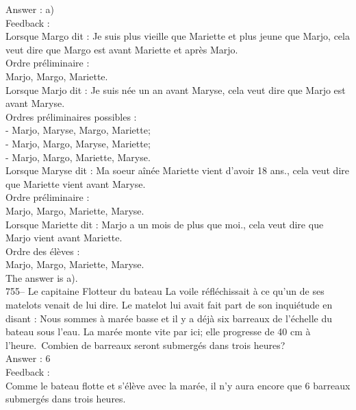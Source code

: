 \documentclass[letterpaper, 12pt]{article}
\begin{document}
Answer : a)\\

Feedback : \\
Lorsque Margo dit : \og Je suis plus vieille que Mariette et plus
jeune que Marjo\fg , cela veut dire que Margo est avant Mariette et
apr\`es Marjo.\\

Ordre pr\'eliminaire :\\
Marjo, Margo, Mariette.\\

Lorsque Marjo dit : \og Je suis n\'ee un an avant Maryse\fg , cela
veut dire que Marjo est avant Maryse.\\

Ordres pr\'eliminaires possibles :\\
- Marjo, Maryse, Margo, Mariette;\\
- Marjo, Margo, Maryse, Mariette;\\
- Marjo, Margo, Mariette, Maryse.\\

Lorsque Maryse dit : \og Ma soeur a\^in\'ee Mariette vient d'avoir
18 ans.\fg , cela veut dire  que Mariette vient avant Maryse.\\

Ordre pr\'eliminaire :\\
Marjo, Margo, Mariette, Maryse.\\

Lorsque Mariette dit : \og Marjo a un mois de plus que moi.\fg ,
cela veut dire que Marjo vient avant Mariette.\\

Ordre des \'el\`eves :\\
Marjo, Margo, Mariette, Maryse.\\

The answer is a).\\

755-- Le capitaine Flotteur du bateau La voile r\'efl\'echissait \`a
ce qu'un de ses matelots venait de lui dire.  Le matelot lui avait
fait part de son inqui\'etude en disant : \og Nous sommes \`a
mar\'ee basse et il y a d\'ej\`a  six barreaux de l'\'echelle du
bateau sous l'eau.  La mar\'ee monte vite par ici; elle progresse de
40 cm \`a l'heure.\fg\  Combien de
barreaux seront submerg\'es dans trois heures?\\


Answer : 6\\

Feedback : \\
Comme le bateau flotte et s'\'el\`eve avec la mar\'ee, il n'y aura encore
que 6 barreaux submerg\'es dans trois heures.\\
\end{document}
